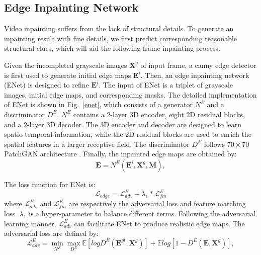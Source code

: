 \subsection{Edge Inpainting Network}
Video inpainting suffers from the lack of structural details.
To generate an inpainting result with fine details, we first predict corresponding reasonable structural clues, which will aid the following frame inpainting process.

Given the incompleted grayscale images $\boldsymbol{X}^{g}$ of input frame, a canny edge detector is first used to generate initial edge maps $\boldsymbol{E}^{i}$. 
Then, an edge inpainting network (ENet) is designed to refine $\boldsymbol{E}^{i}$.
The input of ENet is a triplet of grayscale images, initial edge maps, and corresponding masks. 
The detailed implementation of ENet is shown in Fig.~\ref{enet}, which consists of a generator $N^E$ and a discriminator $D^E$.
$N^E$ contains a 2-layer 3D encoder, eight 2D residual blocks, and a 2-layer 3D decoder. The 3D encoder and decoder are designed to learn spatio-temporal information, while the 2D residual blocks are used to enrich the spatial features in a larger receptive field. The discriminator $D^E$ follows $70\times 70$ PatchGAN architecture \cite{Isola_2017_CVPR}.
Finally, the inpainted edge maps are obtained by:
\begin{equation}
	\label{eq:edgenet}
	\boldsymbol{E}=N^E(\boldsymbol{E}^{i},\boldsymbol{X}^{g},\boldsymbol{M}),
\end{equation}

The loss function for ENet is:
\begin{equation}
	\label{eq:loss_e}
	\mathcal{L}_{edge}=\mathcal{L}^E_{adv}+\lambda_1 * \mathcal{L}^E_{fm}
\end{equation}
where $\mathcal{L}^E_{adv}$ and $\mathcal{L}^E_{fm}$ are respectively the adversarial loss and feature matching loss. 
$\lambda_1$ is a hyper-parameter to balance different terms.
Following the adversarial learning manner, $\mathcal{L}^E_{adv}$ can facilitate ENet to produce realistic edge maps. The adversarial loss are defined by:
\begin{equation}
	\label{eq:edge_adver}
	\mathcal{L}^E_{adv}=\min\limits_{N^E} \max \limits_{D^E}\mathbb{E}[logD^E(\boldsymbol{E}^{gt},\boldsymbol{X}^{g})]+\mathbb{E}log[1-D^E(\boldsymbol{E},\boldsymbol{X}^{g})],
\end{equation}

